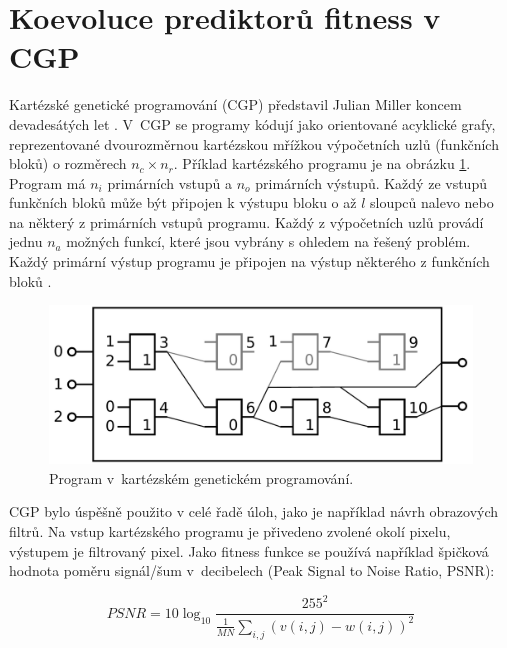\documentclass[fleqn,11pt]{ExcelAtFIT} %
\begin{document}
\section{Koevoluce prediktorů fitness v CGP}
\label{sec:Coevolution}

Kartézské genetické programování (CGP) představil Julian Miller koncem devadesátých let \cite{Miller2000}. V~CGP se programy kódují jako orientované acyklické grafy, reprezentované dvourozměrnou kartézskou mřížkou výpočetních uzlů (funkčních bloků) o rozměrech $n_c \times n_r$. Příklad kartézského programu je na obrázku \ref{fig:CgpCircuit}. Program má $n_i$ primárních vstupů a $n_o$ primárních výstupů. Každý ze vstupů funkčních bloků může být připojen k výstupu bloku o až $l$ sloupců nalevo nebo na některý z primárních vstupů programu. Každý z výpočetních uzlů provádí jednu $n_a$ možných funkcí, které jsou vybrány s ohledem na řešený problém. Každý primární výstup programu je připojen na výstup některého z funkčních bloků \cite{ZelenaCGP}.

\begin{figure}[h]
    \centering\includegraphics[width=\linewidth]{images/cgp.pdf}
    \caption{Program v~kartézském genetickém programování.}
    \label{fig:CgpCircuit}
\end{figure}

CGP bylo úspěšně použito v celé řadě úloh, jako je například návrh obrazových filtrů. Na vstup kartézského programu je přivedeno zvolené okolí pixelu, výstupem je filtrovaný pixel. Jako fitness funkce se používá například špičková hodnota poměru signál/šum v~decibelech (Peak Signal to Noise Ratio, PSNR):

\begin{equation}
    \label{eq:PSNR}
    \mathit{PSNR} = 10 \log_{10} \frac{255^2}{\frac{1}{MN} \sum\limits_{i,j} \left( v\left( i, j \right) - w\left( i, j \right)  \right)^2 }
\end{equation}
\end{document}
